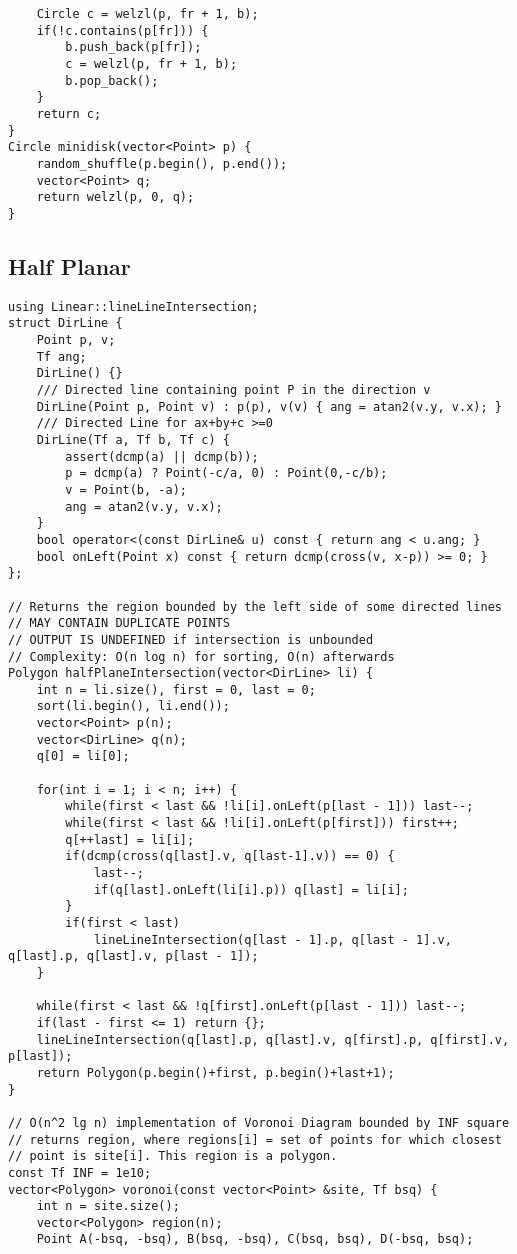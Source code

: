 \documentclass[FSZ,a4paper,onesided]{article}
\begin{document}
\begin{multicols*}{\COLS}
\begin{lstlisting}
    Circle c = welzl(p, fr + 1, b);
    if(!c.contains(p[fr])) {
        b.push_back(p[fr]);
        c = welzl(p, fr + 1, b);
        b.pop_back();
    }
    return c;
}
Circle minidisk(vector<Point> p) {
    random_shuffle(p.begin(), p.end());
    vector<Point> q;
    return welzl(p, 0, q);
}\end{lstlisting}
\subsection{Half Planar}
\begin{lstlisting}
using Linear::lineLineIntersection;
struct DirLine {
    Point p, v;
    Tf ang;
    DirLine() {}
    /// Directed line containing point P in the direction v
    DirLine(Point p, Point v) : p(p), v(v) { ang = atan2(v.y, v.x); }
    /// Directed Line for ax+by+c >=0
    DirLine(Tf a, Tf b, Tf c) {
        assert(dcmp(a) || dcmp(b));
        p = dcmp(a) ? Point(-c/a, 0) : Point(0,-c/b);
        v = Point(b, -a);
        ang = atan2(v.y, v.x);
    }
    bool operator<(const DirLine& u) const { return ang < u.ang; }
    bool onLeft(Point x) const { return dcmp(cross(v, x-p)) >= 0; }
};

// Returns the region bounded by the left side of some directed lines
// MAY CONTAIN DUPLICATE POINTS
// OUTPUT IS UNDEFINED if intersection is unbounded
// Complexity: O(n log n) for sorting, O(n) afterwards
Polygon halfPlaneIntersection(vector<DirLine> li) {
    int n = li.size(), first = 0, last = 0;
    sort(li.begin(), li.end());
    vector<Point> p(n);
    vector<DirLine> q(n);
    q[0] = li[0];

    for(int i = 1; i < n; i++) {
        while(first < last && !li[i].onLeft(p[last - 1])) last--;
        while(first < last && !li[i].onLeft(p[first])) first++;
        q[++last] = li[i];
        if(dcmp(cross(q[last].v, q[last-1].v)) == 0) {
            last--;
            if(q[last].onLeft(li[i].p)) q[last] = li[i];
        }
        if(first < last)
            lineLineIntersection(q[last - 1].p, q[last - 1].v, q[last].p, q[last].v, p[last - 1]);
    }

    while(first < last && !q[first].onLeft(p[last - 1])) last--;
    if(last - first <= 1) return {};
    lineLineIntersection(q[last].p, q[last].v, q[first].p, q[first].v, p[last]);
    return Polygon(p.begin()+first, p.begin()+last+1);
}

// O(n^2 lg n) implementation of Voronoi Diagram bounded by INF square
// returns region, where regions[i] = set of points for which closest
// point is site[i]. This region is a polygon.
const Tf INF = 1e10;
vector<Polygon> voronoi(const vector<Point> &site, Tf bsq) {
    int n = site.size();
    vector<Polygon> region(n);
    Point A(-bsq, -bsq), B(bsq, -bsq), C(bsq, bsq), D(-bsq, bsq);


\end{lstlisting}
\end{multicols*}
\end{document}
